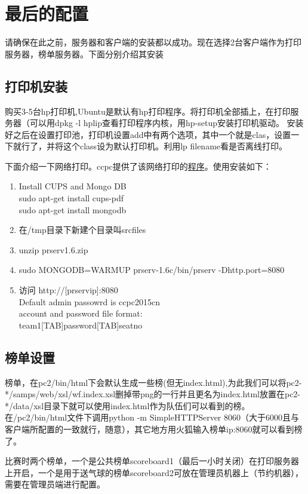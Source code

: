 \documentclass[12pt]{article}
\begin{document}
\section{最后的配置}
请确保在此之前，服务器和客户端的安装都以成功。现在选择2台客户端作为打印服务器，榜单服务器。下面分别介绍其安装


\subsection{打印机安装}
购买3-5台hp打印机,Ubuntu是默认有hp打印程序。将打印机全部插上，在打印服务器（可以用dpkg -l hplip查看打印程序内核，用hp-setup安装打印机驱动。
安装好之后在设置打印池，打印机设置add中有两个选项，其中一个就是clas，设置一下就行了，并将这个class设为默认打印机。利用lp filename看是否离线打印。

下面介绍一下网络打印。ccpc提供了该网络打印的\href{http://board.acmicpc.cn/soft.html}{程序}。使用安装如下：
\begin{enumerate}
\item
Install CUPS and Mongo DB \\
sudo apt-get install cups-pdf \\
sudo apt-get install mongodb
\item
在/tmp目录下新建个目录叫srcfiles
\item
unzip prserv1.6.zip
\item
sudo MONGODB=WARMUP prserv-1.6c/bin/prserv -Dhttp.port=8080
\item
访问 http://[prservip]:8080  \\
Default admin passowrd is ccpc2015cn \\
account and password file format: \\
team1[TAB]password[TAB]seatno 
\end{enumerate}


\subsection{榜单设置}
榜单，在pc2/bin/html下会默认生成一些榜(但无index.html),为此我们可以将pc2-*/samps/web/xsl/wf.index.xsl删掉带png的一行并且更名为index.html放置在pc2-*/data/xsl目录下就可以使用index.html作为队伍们可以看到的榜。在/pc2/bin/html文件下调用python -m SimpleHTTPServer 8060（大于6000且与客户端所配置的一致就行，随意），其它地方用火狐输入榜单ip:8060就可以看到榜了。

比赛时两个榜单，一个是公共榜单scoreboard1（最后一小时关闭）在打印服务器上开启，一个是用于送气球的榜单scoreboard2可放在管理员机器上（节约机器），需要在管理员端进行配置。
\end{document}
